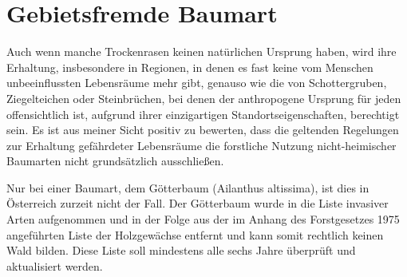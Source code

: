 \documentclass[twocolumn]{scrartcl}
\begin{document}
\section{Gebietsfremde Baumart}

Auch wenn manche Trockenrasen keinen natürlichen Ursprung haben, wird
ihre Erhaltung, insbesondere in Regionen, in denen es fast keine vom
Menschen unbeeinflussten Lebensräume mehr gibt, genauso wie die von
Schottergruben, Ziegelteichen oder Steinbrüchen, bei denen der
anthropogene Ursprung für jeden offensichtlich ist, aufgrund ihrer
einzigartigen Standortseigenschaften, berechtigt sein. Es ist aus
meiner Sicht positiv zu bewerten, dass die geltenden Regelungen zur
Erhaltung gefährdeter Lebensräume die forstliche Nutzung
nicht-heimischer Baumarten nicht grundsätzlich ausschließen.

Nur bei einer Baumart, dem Götterbaum (Ailanthus altissima), ist dies
in Österreich zurzeit nicht der Fall. Der Götterbaum wurde in die
Liste invasiver Arten aufgenommen
\citep{eu2019verordnungListeInvasiverArten,eu2014verordnungInvasiverArten}
und in der Folge aus der im Anhang des Forstgesetzes 1975 angeführten
Liste der Holzgewächse entfernt und kann somit rechtlich keinen Wald
bilden. Diese Liste soll mindestens alle sechs Jahre überprüft und
aktualisiert werden.
\end{document}
